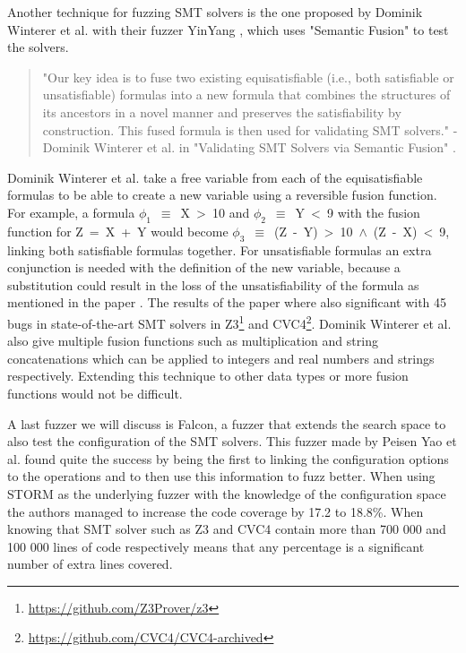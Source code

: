 \label{fuzzing:SemanticFusion}
Another technique for fuzzing SMT solvers is the one proposed by Dominik Winterer et al. with their fuzzer YinYang \cite{43YinYang}, which uses "Semantic Fusion" to test the solvers.
\begin{quote}
	\label{quote:Fuzzing:YinYang}
	"Our key idea is to fuse two existing equisatisfiable (i.e., both satisfiable or unsatisfiable) formulas into a new formula that combines the structures of its ancestors in a novel manner and preserves the satisfiability by construction. This fused formula is then used for validating SMT solvers."
	\newline
	-Dominik Winterer et al. in "Validating SMT Solvers via Semantic Fusion" \cite{43YinYang}.
\end{quote}
Dominik Winterer et al. take a free variable from each of the equisatisfiable formulas to be able to create a new variable using a reversible fusion function. For example, a formula \mbox{$\phi_1$ $\equiv$ X > 10} and \mbox{$\phi_2$ $\equiv$ Y < 9} with the fusion function for \mbox{Z = X + Y} would become \mbox{$\phi_3$ $\equiv$ (Z - Y) > 10 $\land$ (Z - X) < 9}, linking both satisfiable formulas together. For unsatisfiable formulas an extra conjunction is needed with the definition of the new variable, because a substitution could result in the loss of the unsatisfiability of the formula as mentioned in the paper \cite{43YinYang}. The results of the paper where also significant with 45 bugs in state-of-the-art SMT solvers in Z3\footnote{\url{https://github.com/Z3Prover/z3}} and CVC4\footnote{\url{https://github.com/CVC4/CVC4-archived}}. Dominik Winterer et al. also give multiple fusion functions such as multiplication and string concatenations which can be applied to integers and real numbers and strings respectively. Extending this technique to other data types or more fusion functions would not be difficult.


A last fuzzer we will discuss is Falcon, a fuzzer that extends the search space to also test the configuration of the SMT solvers. This fuzzer made by Peisen Yao et al. \cite{42FalconFuzzingConfigurationSettingsAndNormal} found quite the success by being the first to linking the configuration options to the operations and to then use this information to fuzz better.
When using STORM as the underlying fuzzer with the knowledge of the configuration space the authors managed to increase the code coverage by 17.2 to 18.8\%. When knowing that SMT solver such as Z3 and CVC4 contain more than 700 000 and 100 000 lines of code respectively means that any percentage is a significant number of extra lines covered.

